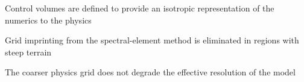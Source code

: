 \documentclass{agujournal}
\begin{document}





\begin{keypoints}
\item Control volumes are defined to provide an isotropic representation of the numerics to the physics
\item Grid imprinting from the spectral-element method is eliminated in regions with steep terrain
\item The coarser physics grid does not degrade the effective resolution of the model
\end{keypoints}

%
%

\end{document}
